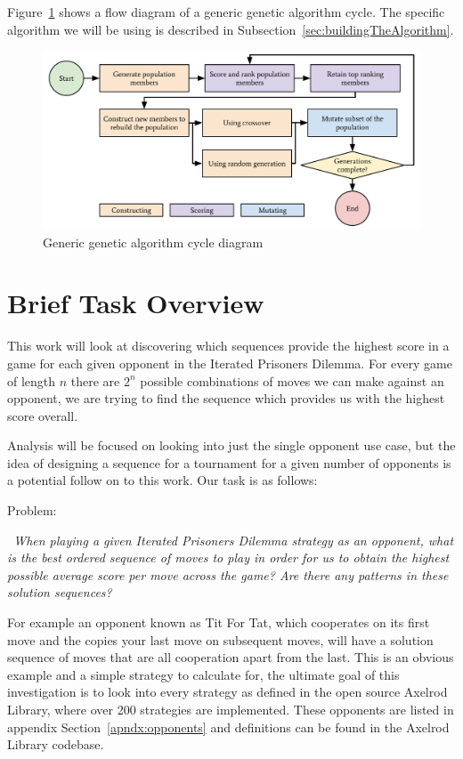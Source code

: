 Figure~\ref{fig:genericGACycle} shows a flow diagram of a generic genetic algorithm cycle.
The specific algorithm we will be using is described in Subsection~\ref{sec:buildingTheAlgorithm}.

\begin{figure}[ht]
    \centering
    \includegraphics[width=1.0\textwidth, center]{./img/flows/ga_cycle.pdf}
    \caption{Generic genetic algorithm cycle diagram}\label{fig:genericGACycle} 
\end{figure}

\section{Brief Task Overview}\label{sec:briefOverview}
This work will look at discovering which sequences provide the highest score in a game for each given opponent in the Iterated Prisoners Dilemma.
For every game of length $n$ there are $2^n$ possible combinations of moves we can make against an opponent, we are trying to find the sequence which provides us with the highest score overall.

Analysis will be focused on looking into just the single opponent use case, but the idea of designing a sequence for a tournament for a given number of opponents is a potential follow on to this work.
Our task is as follows:

Problem:
\begin{center}
    \itshape~When playing a given Iterated Prisoners Dilemma strategy as an opponent, what is the best ordered sequence of moves to play in order for us to obtain the highest possible average score per move across the game? Are there any patterns in these solution sequences?
\end{center}

For example an opponent known as Tit For Tat, which cooperates on its first move and the copies your last move on subsequent moves, will have a solution sequence of moves that are all cooperation apart from the last.
This is an obvious example and a simple strategy to calculate for, the ultimate goal of this investigation is to look into every strategy as defined in the open source Axelrod Library\cite{axelrodproject}, where over 200 strategies are implemented.
These opponents are listed in appendix Section~\ref{apndx:opponents} and definitions can be found in the Axelrod Library codebase.

